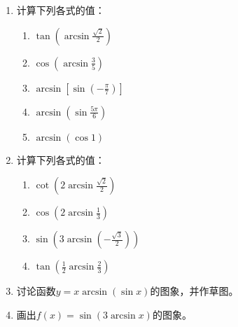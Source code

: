\begin{enumerate}
\item 计算下列各式的值：
\begin{multicols}{2}
    \begin{enumerate}
        \item $\tan\left(\arcsin\frac{\sqrt{2}}{2}\right)$
        \item $\cos\left(\arcsin \frac{3}{5}\right)$
        \item $\arcsin \left[\sin\left(-\frac{\pi}{7}\right)\right]$
        \item $\arcsin\left(\sin\frac{5\pi}{6}\right)$
        \item $\arcsin(\cos1)$
    \end{enumerate}
    \end{multicols}
    \item 计算下列各式的值：
\begin{multicols}{2}
    \begin{enumerate}
        \item $\cot\left(2\arcsin\frac{\sqrt{2}}{2}\right)$
        \item $\cos\left(2\arcsin\frac{1}{3}\right)$
        \item $\sin\left(3\arcsin\left(-\frac{\sqrt{3}}{2}\right)\right)$
        \item $\tan\left(\frac{1}{2}\arcsin\frac{2}{3}\right)$
    \end{enumerate}
    \end{multicols}

    \item 讨论函数$y=x \arcsin(\sin x)$的图象，并作草图。
\item 画出$f(x)=\sin(3\arcsin x)$的图象。
\end{enumerate}